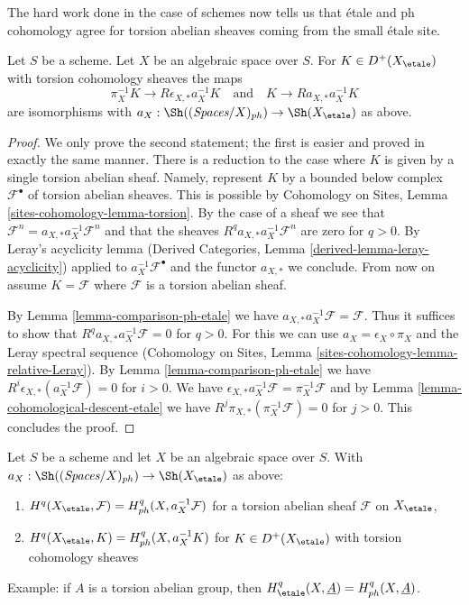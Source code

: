 \noindent
The hard work done in the case of schemes now tells us that
\'etale and ph cohomology agree for torsion abelian sheaves coming from the
small \'etale site.

\begin{lemma}
\label{lemma-cohomological-descent-etale-ph}
Let $S$ be a scheme. Let $X$ be an algebraic space over $S$.
For $K \in D^+(X_\etale)$ with torsion cohomology sheaves the maps
$$
\pi_X^{-1}K \longrightarrow R\epsilon_{X, *}a_X^{-1}K
\quad\text{and}\quad
K \longrightarrow Ra_{X, *}a_X^{-1}K
$$
are isomorphisms with
$a_X : \Sh((\textit{Spaces}/X)_{ph}) \to \Sh(X_\etale)$ as above.
\end{lemma}

\begin{proof}
We only prove the second statement; the first is easier and proved in exactly
the same manner. There is a reduction to the case where
$K$ is given by a single torsion abelian sheaf. Namely, represent $K$
by a bounded below complex $\mathcal{F}^\bullet$ of torsion
abelian sheaves. This is possible by Cohomology on Sites, Lemma
\ref{sites-cohomology-lemma-torsion}.
By the case of a sheaf we see that
$\mathcal{F}^n = a_{X, *} a_X^{-1} \mathcal{F}^n$
and that the sheaves $R^qa_{X, *}a_X^{-1}\mathcal{F}^n$
are zero for $q > 0$. By Leray's acyclicity lemma
(Derived Categories, Lemma \ref{derived-lemma-leray-acyclicity})
applied to $a_X^{-1}\mathcal{F}^\bullet$
and the functor $a_{X, *}$ we conclude. From now on assume
$K = \mathcal{F}$ where $\mathcal{F}$ is a torsion abelian sheaf.

\medskip\noindent
By Lemma \ref{lemma-comparison-ph-etale} we have
$a_{X, *}a_X^{-1}\mathcal{F} = \mathcal{F}$. Thus it suffices to show that
$R^qa_{X, *}a_X^{-1}\mathcal{F} = 0$ for $q > 0$.
For this we can use $a_X = \epsilon_X \circ \pi_X$ and
the Leray spectral sequence
(Cohomology on Sites, Lemma \ref{sites-cohomology-lemma-relative-Leray}).
By Lemma \ref{lemma-comparison-ph-etale}
we have $R^i\epsilon_{X, *}(a_X^{-1}\mathcal{F}) = 0$ for $i > 0$.
We have
$\epsilon_{X, *}a_X^{-1}\mathcal{F} = \pi_X^{-1}\mathcal{F}$
and by Lemma \ref{lemma-cohomological-descent-etale} we have
$R^j\pi_{X, *}(\pi_X^{-1}\mathcal{F}) = 0$ for $j > 0$.
This concludes the proof.
\end{proof}

\begin{lemma}
\label{lemma-compare-cohomology-etale-ph}
Let $S$ be a scheme and let $X$ be an algebraic space over $S$.
With $a_X : \Sh((\textit{Spaces}/X)_{ph}) \to \Sh(X_\etale)$
as above:
\begin{enumerate}
\item $H^q(X_\etale, \mathcal{F}) = H^q_{ph}(X, a_X^{-1}\mathcal{F})$
for a torsion abelian sheaf $\mathcal{F}$ on $X_\etale$,
\item $H^q(X_\etale, K) = H^q_{ph}(X, a_X^{-1}K)$ for $K \in D^+(X_\etale)$
with torsion cohomology sheaves
\end{enumerate}
Example: if $A$ is a torsion abelian group, then
$H^q_\etale(X, \underline{A}) = H^q_{ph}(X, \underline{A})$.
\end{lemma}

